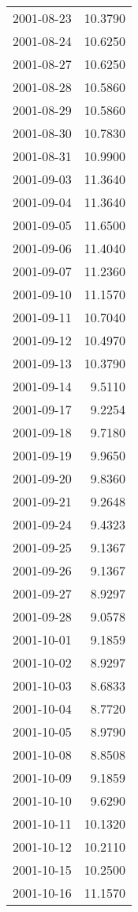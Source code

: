 \begin{tabular}{lr}
2001-08-23 &     10.3790 \\
2001-08-24 &     10.6250 \\
2001-08-27 &     10.6250 \\
2001-08-28 &     10.5860 \\
2001-08-29 &     10.5860 \\
2001-08-30 &     10.7830 \\
2001-08-31 &     10.9900 \\
2001-09-03 &     11.3640 \\
2001-09-04 &     11.3640 \\
2001-09-05 &     11.6500 \\
2001-09-06 &     11.4040 \\
2001-09-07 &     11.2360 \\
2001-09-10 &     11.1570 \\
2001-09-11 &     10.7040 \\
2001-09-12 &     10.4970 \\
2001-09-13 &     10.3790 \\
2001-09-14 &      9.5110 \\
2001-09-17 &      9.2254 \\
2001-09-18 &      9.7180 \\
2001-09-19 &      9.9650 \\
2001-09-20 &      9.8360 \\
2001-09-21 &      9.2648 \\
2001-09-24 &      9.4323 \\
2001-09-25 &      9.1367 \\
2001-09-26 &      9.1367 \\
2001-09-27 &      8.9297 \\
2001-09-28 &      9.0578 \\
2001-10-01 &      9.1859 \\
2001-10-02 &      8.9297 \\
2001-10-03 &      8.6833 \\
2001-10-04 &      8.7720 \\
2001-10-05 &      8.9790 \\
2001-10-08 &      8.8508 \\
2001-10-09 &      9.1859 \\
2001-10-10 &      9.6290 \\
2001-10-11 &     10.1320 \\
2001-10-12 &     10.2110 \\
2001-10-15 &     10.2500 \\
2001-10-16 &     11.1570 \\

\end{tabular}
